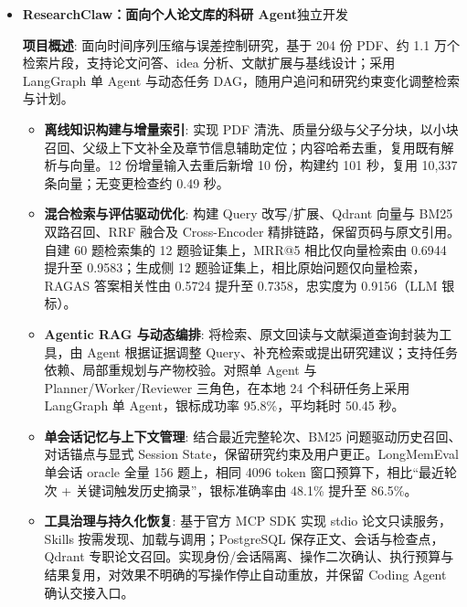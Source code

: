 \documentclass[zh]{resume}
\begin{document}
\begin{itemize}
\item \textbf{ResearchClaw：面向个人论文库的科研 Agent}\hfill 独立开发

\textbf{项目概述}: 面向时间序列压缩与误差控制研究，基于 204 份 PDF、约 1.1 万个检索片段，支持论文问答、idea 分析、文献扩展与基线设计；采用 LangGraph 单 Agent 与动态任务 DAG，随用户追问和研究约束变化调整检索与计划。
\begin{itemize}
\item \textbf{离线知识构建与增量索引}: 实现 PDF 清洗、质量分级与父子分块，以小块召回、父级上下文补全及章节信息辅助定位；内容哈希去重，复用既有解析与向量。12 份增量输入去重后新增 10 份，构建约 101 秒，复用 10,337 条向量；无变更检查约 0.49 秒。
\item \textbf{混合检索与评估驱动优化}: 构建 Query 改写/扩展、Qdrant 向量与 BM25 双路召回、RRF 融合及 Cross-Encoder 精排链路，保留页码与原文引用。自建 60 题检索集的 12 题验证集上，MRR@5 相比仅向量检索由 0.6944 提升至 0.9583；生成侧 12 题验证集上，相比原始问题仅向量检索，RAGAS 答案相关性由 0.5724 提升至 0.7358，忠实度为 0.9156（LLM 银标）。
\item \textbf{Agentic RAG 与动态编排}: 将检索、原文回读与文献渠道查询封装为工具，由 Agent 根据证据调整 Query、补充检索或提出研究建议；支持任务依赖、局部重规划与产物校验。对照单 Agent 与 Planner/Worker/Reviewer 三角色，在本地 24 个科研任务上采用 LangGraph 单 Agent，银标成功率 95.8\%，平均耗时 50.45 秒。
\item \textbf{单会话记忆与上下文管理}: 结合最近完整轮次、BM25 问题驱动历史召回、对话锚点与显式 Session State，保留研究约束及用户更正。LongMemEval 单会话 oracle 全量 156 题上，相同 4096 token 窗口预算下，相比“最近轮次 + 关键词触发历史摘录”，银标准确率由 48.1\% 提升至 86.5\%。
\item \textbf{工具治理与持久化恢复}: 基于官方 MCP SDK 实现 stdio 论文只读服务，Skills 按需发现、加载与调用；PostgreSQL 保存正文、会话与检查点，Qdrant 专职论文召回。实现身份/会话隔离、操作二次确认、执行预算与结果复用，对效果不明确的写操作停止自动重放，并保留 Coding Agent 确认交接入口。
\end{itemize}
\end{itemize}
\end{document}
